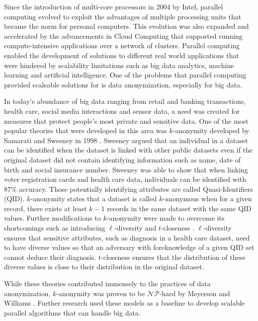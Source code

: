 \documentclass[11pt]{article}       %
\begin{document}
Since the introduction of multi-core processors in 2004 by Intel\textsuperscript{\textregistered}, parallel computing evolved to exploit the advantages of multiple processing units that became the norm for personal computers. This evolution was also expanded and accelerated by the advancements in Cloud Computing that supported running compute-intensive applications over a network of clusters. Parallel computing enabled the development of solutions to different real world applications that were hindered by scalability limitations such as big data analytics, machine learning and artificial intelligence. One of the problems that parallel computing provided scaleable solutions for is data anonymization, especially for big data. 

In today's abundance of big data ranging from retail and banking transactions, health care, social media interactions and sensor data, a need was created for measures that protect people's most private and sensitive data. One of the most popular theories that were developed in this area was $k$-anonymity developed by Samarati and Sweeney in 1998 \cite{Samarati-P.:1998}. Sweeney argued that an individual in a dataset can be identified when the dataset is linked with other public datasets even if the original dataset did not contain identifying information such as name, date of birth and social insurance number. Sweeney was able to show that when linking voter registration cards and health care data, individuals can be identified with 87\% accuracy. Those potentially identifying attributes are called Quasi-Identifiers (QID). $k$-anonymity states that a dataset is called $k$-anonymous when for a given record, there exists at least \(k-1\) records in the same dataset with the same QID values.  Further modifications to $k$-anonymity were made to overcome its shortcomings such as introducing $\ell$-diversity \cite{Machanavajjhala:2007} and $t$-closeness \cite{Li-N.:2007}. $\ell$-diversity ensures that sensitive attributes, such as diagnosis in a health care dataset, need to have diverse values so that an adversary with foreknowledge of a given QID set cannot deduce their diagnosis. $t$-closeness ensures that the distribution of these diverse values is close to their distribution in the original dataset.

While these theories contributed immensely to the practices of data anonymization, $k$-anonymity was proven to be $\mathcal{NP}$-hard by Meyerson and Williams \cite{Meyerson:2004}. Further research used these models as a baseline to develop scalable parallel algorithms that can handle big data.
\end{document}

